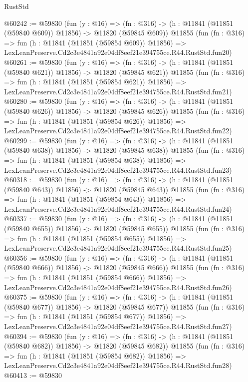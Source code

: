 \begin{lexlean}{RustStd}
\begin{coremodule}
@60242 := @59830
    (fun (y : @16) =>
    (fn : @316) -> (h : @11841 (@11851 (@59840 @609)) @11856) -> @11820 (@59845 @609))
    @11855
    (fun (fn : @316) =>
    fun (h : @11841 (@11851 (@59854 @609)) @11856) =>
    LexLeanPreserve.Cd2c3e4841a92e04df8eef21e394755ce.R44.RustStd.fun20)
@60261 := @59830
    (fun (y : @16) =>
    (fn : @316) -> (h : @11841 (@11851 (@59840 @621)) @11856) -> @11820 (@59845 @621))
    @11855
    (fun (fn : @316) =>
    fun (h : @11841 (@11851 (@59854 @621)) @11856) =>
    LexLeanPreserve.Cd2c3e4841a92e04df8eef21e394755ce.R44.RustStd.fun21)
@60280 := @59830
    (fun (y : @16) =>
    (fn : @316) -> (h : @11841 (@11851 (@59840 @626)) @11856) -> @11820 (@59845 @626))
    @11855
    (fun (fn : @316) =>
    fun (h : @11841 (@11851 (@59854 @626)) @11856) =>
    LexLeanPreserve.Cd2c3e4841a92e04df8eef21e394755ce.R44.RustStd.fun22)
@60299 := @59830
    (fun (y : @16) =>
    (fn : @316) -> (h : @11841 (@11851 (@59840 @638)) @11856) -> @11820 (@59845 @638))
    @11855
    (fun (fn : @316) =>
    fun (h : @11841 (@11851 (@59854 @638)) @11856) =>
    LexLeanPreserve.Cd2c3e4841a92e04df8eef21e394755ce.R44.RustStd.fun23)
@60318 := @59830
    (fun (y : @16) =>
    (fn : @316) -> (h : @11841 (@11851 (@59840 @643)) @11856) -> @11820 (@59845 @643))
    @11855
    (fun (fn : @316) =>
    fun (h : @11841 (@11851 (@59854 @643)) @11856) =>
    LexLeanPreserve.Cd2c3e4841a92e04df8eef21e394755ce.R44.RustStd.fun24)
@60337 := @59830
    (fun (y : @16) =>
    (fn : @316) -> (h : @11841 (@11851 (@59840 @655)) @11856) -> @11820 (@59845 @655))
    @11855
    (fun (fn : @316) =>
    fun (h : @11841 (@11851 (@59854 @655)) @11856) =>
    LexLeanPreserve.Cd2c3e4841a92e04df8eef21e394755ce.R44.RustStd.fun25)
@60356 := @59830
    (fun (y : @16) =>
    (fn : @316) -> (h : @11841 (@11851 (@59840 @666)) @11856) -> @11820 (@59845 @666))
    @11855
    (fun (fn : @316) =>
    fun (h : @11841 (@11851 (@59854 @666)) @11856) =>
    LexLeanPreserve.Cd2c3e4841a92e04df8eef21e394755ce.R44.RustStd.fun26)
@60375 := @59830
    (fun (y : @16) =>
    (fn : @316) -> (h : @11841 (@11851 (@59840 @677)) @11856) -> @11820 (@59845 @677))
    @11855
    (fun (fn : @316) =>
    fun (h : @11841 (@11851 (@59854 @677)) @11856) =>
    LexLeanPreserve.Cd2c3e4841a92e04df8eef21e394755ce.R44.RustStd.fun27)
@60394 := @59830
    (fun (y : @16) =>
    (fn : @316) -> (h : @11841 (@11851 (@59840 @682)) @11856) -> @11820 (@59845 @682))
    @11855
    (fun (fn : @316) =>
    fun (h : @11841 (@11851 (@59854 @682)) @11856) =>
    LexLeanPreserve.Cd2c3e4841a92e04df8eef21e394755ce.R44.RustStd.fun28)
@60413 := @59830

\end{coremodule}
\end{lexlean}
